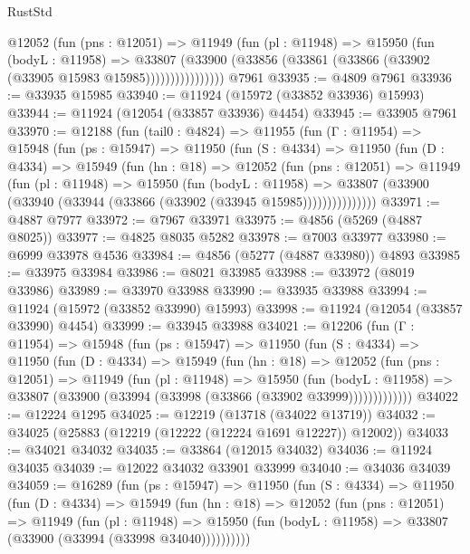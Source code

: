 \begin{lexlean}{RustStd}
\begin{coremodule}
                @12052
                  (fun (pns : @12051) =>
                  @11949
                    (fun (pl : @11948) =>
                    @15950
                      (fun (bodyL : @11958) =>
                      @33807
                        (@33900
                          (@33856 (@33861 (@33866 (@33902 (@33905 @15983 @15985))))))))))))))))
    @7961
@33935 := @4809 @7961
@33936 := @33935 @15985
@33940 := @11924 (@15972 (@33852 @33936) @15993)
@33944 := @11924 (@12054 (@33857 @33936) @4454)
@33945 := @33905 @7961
@33970 := @12188
    (fun (tail0 : @4824) =>
    @11955
      (fun (Γ : @11954) =>
      @15948
        (fun (ps : @15947) =>
        @11950
          (fun (S : @4334) =>
          @11950
            (fun (D : @4334) =>
            @15949
              (fun (hn : @18) =>
              @12052
                (fun (pns : @12051) =>
                @11949
                  (fun (pl : @11948) =>
                  @15950
                    (fun (bodyL : @11958) =>
                    @33807 (@33900 (@33940 (@33944 (@33866 (@33902 (@33945 @15985)))))))))))))))
@33971 := @4887 @7977
@33972 := @7967 @33971
@33975 := @4856 (@5269 (@4887 @8025))
@33977 := @4825 @8035 @5282
@33978 := @7003 @33977
@33980 := @6999 @33978 @4536
@33984 := @4856 (@5277 (@4887 @33980)) @4893
@33985 := @33975 @33984
@33986 := @8021 @33985
@33988 := @33972 (@8019 @33986)
@33989 := @33970 @33988
@33990 := @33935 @33988
@33994 := @11924 (@15972 (@33852 @33990) @15993)
@33998 := @11924 (@12054 (@33857 @33990) @4454)
@33999 := @33945 @33988
@34021 := @12206
    (fun (Γ : @11954) =>
    @15948
      (fun (ps : @15947) =>
      @11950
        (fun (S : @4334) =>
        @11950
          (fun (D : @4334) =>
          @15949
            (fun (hn : @18) =>
            @12052
              (fun (pns : @12051) =>
              @11949
                (fun (pl : @11948) =>
                @15950
                  (fun (bodyL : @11958) =>
                  @33807 (@33900 (@33994 (@33998 (@33866 (@33902 @33999)))))))))))))
@34022 := @12224 @1295
@34025 := @12219 (@13718 (@34022 @13719))
@34032 := @34025 (@25883 (@12219 (@12222 (@12224 @1691 @12227)) @12002))
@34033 := @34021 @34032
@34035 := @33864 (@12015 @34032)
@34036 := @11924 @34035
@34039 := @12022 @34032 @33901 @33999
@34040 := @34036 @34039
@34059 := @16289
    (fun (ps : @15947) =>
    @11950
      (fun (S : @4334) =>
      @11950
        (fun (D : @4334) =>
        @15949
          (fun (hn : @18) =>
          @12052
            (fun (pns : @12051) =>
            @11949
              (fun (pl : @11948) =>
              @15950 (fun (bodyL : @11958) => @33807 (@33900 (@33994 (@33998 @34040))))))))))

\end{coremodule}
\end{lexlean}
